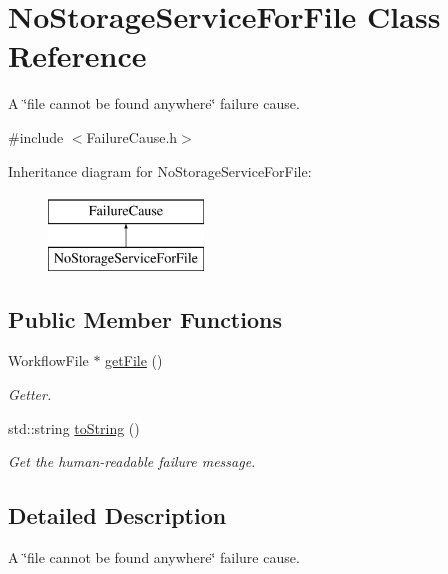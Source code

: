 \hypertarget{class_no_storage_service_for_file}{}\section{No\+Storage\+Service\+For\+File Class Reference}
\label{class_no_storage_service_for_file}


A \char`\"{}file cannot be found anywhere\char`\"{} failure cause.  




{\ttfamily \#include $<$Failure\+Cause.\+h$>$}

Inheritance diagram for No\+Storage\+Service\+For\+File\+:\begin{figure}[H]
\begin{center}
\leavevmode
\includegraphics[height=2.000000cm]{class_no_storage_service_for_file}
\end{center}
\end{figure}
\subsection*{Public Member Functions}
\begin{DoxyCompactItemize}
\item 
Workflow\+File $\ast$ \hyperlink{class_no_storage_service_for_file_ac54e15f8b994dfe9f3c48a6a180d3994}{get\+File} ()
\begin{DoxyCompactList}\small\item\em Getter. \end{DoxyCompactList}\item 
std\+::string \hyperlink{class_no_storage_service_for_file_a77df40bdde415fc7b0db40ae923cdcf9}{to\+String} ()
\begin{DoxyCompactList}\small\item\em Get the human-\/readable failure message. \end{DoxyCompactList}\end{DoxyCompactItemize}


\subsection{Detailed Description}
A \char`\"{}file cannot be found anywhere\char`\"{} failure cause. 

